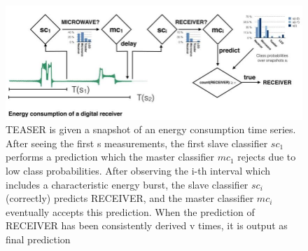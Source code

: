 \begin{figure}[!htbp]
    \captionsetup{justification=raggedright}
    \centering
    \includegraphics[scale = 0.65]{TEASER.JPG}
    \centering
    \caption{TEASER is given a snapshot of an energy consumption time series. After seeing the first s measurements, the first slave classifier $sc_{1}$ performs a prediction which the master classifier $mc_{1}$ rejects due to low class probabilities. After observing the i-th interval which includes a characteristic energy burst, the slave classifier $sc_{i}$ (correctly) predicts RECEIVER, and the master classifier $mc_{i}$ eventually accepts this prediction. When the prediction of RECEIVER has been consistently derived v times, it is output as final prediction  \cite{schafer2020teaser}}
    \label{Img:TEASER}
\end{figure}